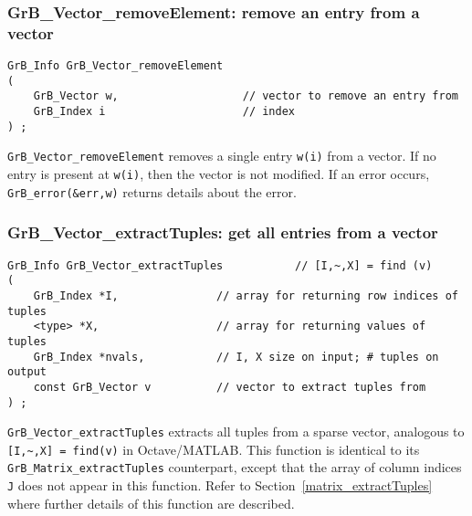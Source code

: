 \documentclass[12pt]{article}
\begin{document}
\subsubsection{{\sf GrB\_Vector\_removeElement:} remove an entry from a vector}
\label{vector_removeElement}

\begin{mdframed}[userdefinedwidth=6in]
{\footnotesize
\begin{verbatim}
GrB_Info GrB_Vector_removeElement
(
    GrB_Vector w,                   // vector to remove an entry from
    GrB_Index i                     // index
) ;
\end{verbatim} } \end{mdframed}

\verb'GrB_Vector_removeElement' removes a single entry \verb'w(i)' from a vector.
If no entry is present at \verb'w(i)', then the vector is not modified.
If an error occurs, \verb'GrB_error(&err,w)' returns details about the error.

\subsubsection{{\sf GrB\_Vector\_extractTuples:} get all entries from a vector}
\label{vector_extractTuples}

\begin{mdframed}[userdefinedwidth=6in]
{\footnotesize
\begin{verbatim}
GrB_Info GrB_Vector_extractTuples           // [I,~,X] = find (v)
(
    GrB_Index *I,               // array for returning row indices of tuples
    <type> *X,                  // array for returning values of tuples
    GrB_Index *nvals,           // I, X size on input; # tuples on output
    const GrB_Vector v          // vector to extract tuples from
) ;
\end{verbatim} } \end{mdframed}

\verb'GrB_Vector_extractTuples' extracts all tuples from a sparse vector,
analogous to \verb'[I,~,X] = find(v)' in Octave/MATLAB.  This function is
identical to its \verb'GrB_Matrix_extractTuples' counterpart, except that the
array of column indices \verb'J' does not appear in this function.  Refer to
Section~\ref{matrix_extractTuples} where further details of this function are
described.
\end{document}
